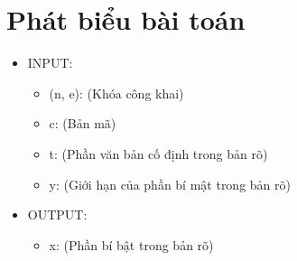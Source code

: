 \documentclass{article}
\begin{document}


\section{Phát biểu bài toán}
\begin{itemize}
    \item  INPUT:
    

    \begin{itemize}
        \item  (n, e): (Khóa công khai)
        \item   c: (Bản mã)
        \item    t: (Phần văn bản cố định trong bản rõ)
        \item     y: (Giới hạn của phần bí mật trong bản rõ)
    \end{itemize}



    \item       OUTPUT:
    \begin{itemize}
        \item          x: (Phần bí bật trong bản rõ)
    \end{itemize}
\end{itemize}


\end{document}
